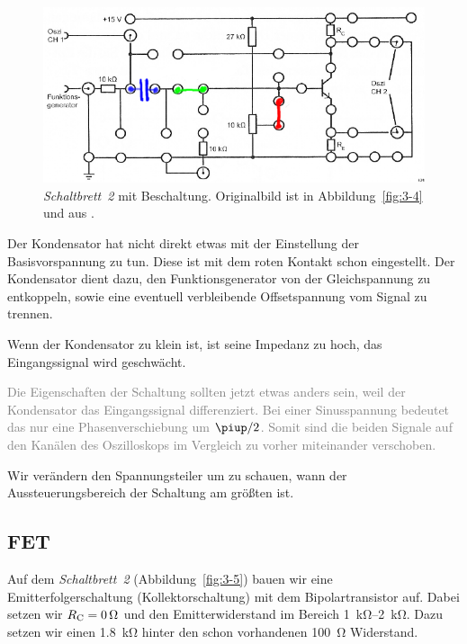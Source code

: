 \begin{figure}[htbp]
	\centering
	\includegraphics[width=\textwidth]{Anleitung/3-4_Arbeitspunkt.png}
	\caption{
		\emph{Schaltbrett~2} mit Beschaltung. Originalbild ist in
		Abbildung~\ref{fig:3-4} und aus
		\cite[Abbildung~3.4]{physik313-Anleitung}.
	}
	\label{fig:3-4_Arbeitspunkt}
\end{figure}

Der Kondensator hat nicht direkt etwas mit der Einstellung der Basisvorspannung
zu tun. Diese ist mit dem roten Kontakt schon eingestellt. Der Kondensator
dient dazu, den Funktionsgenerator von der Gleichspannung zu entkoppeln, sowie
eine eventuell verbleibende Offsetspannung vom Signal zu trennen.

Wenn der Kondensator zu klein ist, ist seine Impedanz zu hoch, das
Eingangssignal wird geschwächt.

\textcolor{gray}{
	Die Eigenschaften der Schaltung sollten jetzt etwas anders sein, weil der
	Kondensator das Eingangssignal differenziert. Bei einer Sinusspannung
	bedeutet das nur eine Phasenverschiebung um $\piup/2$. Somit sind die
	beiden Signale auf den Kanälen des Oszilloskops im Vergleich zu vorher
	miteinander verschoben.
}

Wir verändern den Spannungsteiler um zu schauen, wann der Aussteuerungsbereich
der Schaltung am größten ist.


\FloatBarrier
\subsection{FET}

Auf dem \emph{Schaltbrett~2} (Abbildung~\ref{fig:3-5}) bauen wir eine
Emitterfolgerschaltung (Kollektorschaltung) mit dem Bipolartransistor auf.
Dabei setzen wir $\RC = \SI0\ohm$ und den Emitterwiderstand im Bereich
\SIrange{1}{2}{\kilo\ohm}. Dazu setzen wir einen \SI{1.8}{\kilo\ohm} hinter den
schon vorhandenen \SI{100}{\ohm} Widerstand.

